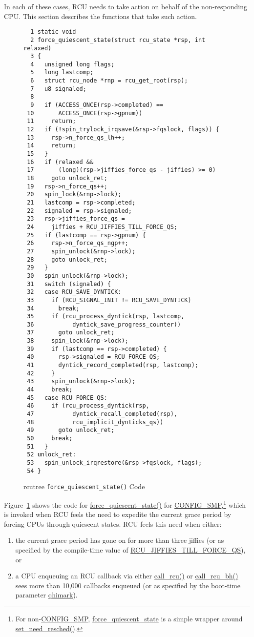 In each of these cases, RCU needs to take action on behalf of the
non-responding CPU.
This section describes the functions that take such action.



\begin{figure}[htbp]
{ \scriptsize
\begin{verbatim}
  1 static void
  2 force_quiescent_state(struct rcu_state *rsp, int relaxed)
  3 {
  4   unsigned long flags;
  5   long lastcomp;
  6   struct rcu_node *rnp = rcu_get_root(rsp);
  7   u8 signaled;
  8 
  9   if (ACCESS_ONCE(rsp->completed) ==
 10       ACCESS_ONCE(rsp->gpnum))
 11     return;
 12   if (!spin_trylock_irqsave(&rsp->fqslock, flags)) {
 13     rsp->n_force_qs_lh++;
 14     return;
 15   }
 16   if (relaxed &&
 17       (long)(rsp->jiffies_force_qs - jiffies) >= 0)
 18     goto unlock_ret;
 19   rsp->n_force_qs++;
 20   spin_lock(&rnp->lock);
 21   lastcomp = rsp->completed;
 22   signaled = rsp->signaled;
 23   rsp->jiffies_force_qs =
 24     jiffies + RCU_JIFFIES_TILL_FORCE_QS;
 25   if (lastcomp == rsp->gpnum) {
 26     rsp->n_force_qs_ngp++;
 27     spin_unlock(&rnp->lock);
 28     goto unlock_ret;
 29   }
 30   spin_unlock(&rnp->lock);
 31   switch (signaled) {
 32   case RCU_SAVE_DYNTICK:
 33     if (RCU_SIGNAL_INIT != RCU_SAVE_DYNTICK)
 34       break;
 35     if (rcu_process_dyntick(rsp, lastcomp,
 36           dyntick_save_progress_counter))
 37       goto unlock_ret;
 38     spin_lock(&rnp->lock);
 39     if (lastcomp == rsp->completed) {
 40       rsp->signaled = RCU_FORCE_QS;
 41       dyntick_record_completed(rsp, lastcomp);
 42     }
 43     spin_unlock(&rnp->lock);
 44     break;
 45   case RCU_FORCE_QS:
 46     if (rcu_process_dyntick(rsp,
 47           dyntick_recall_completed(rsp),
 48           rcu_implicit_dynticks_qs))
 49       goto unlock_ret;
 50     break;
 51   }
 52 unlock_ret:
 53   spin_unlock_irqrestore(&rsp->fqslock, flags);
 54 }
\end{verbatim}
}
\caption{rcutree {\tt force\_quiescent\_state()} Code}
\label{fig:app:rcuimpl:rcutreewt:Code for rcutree force-quiescent-state}
\end{figure}

Figure~\ref{fig:app:rcuimpl:rcutreewt:Code for rcutree force-quiescent-state}
shows the code for \url{force_quiescent_state()} for
\url{CONFIG_SMP},\footnote{
	For non-\url{CONFIG_SMP}, \url{force_quiescent_state} is a
	simple wrapper around \url{set_need_resched()}.}
which is invoked when RCU feels the need to expedite the current
grace period by forcing CPUs through quiescent states.
RCU feels this need when either:
\begin{enumerate}
\item	the current grace period has gone on for more than three jiffies
	(or as specified by the compile-time value of
	\url{RCU_JIFFIES_TILL_FORCE_QS}), or
\item	a CPU enqueuing an RCU callback via either \url{call_rcu()}
	or \url{call_rcu_bh()} sees more than 10,000 callbacks enqueued
	(or as specified by the boot-time parameter \url{qhimark}).
\end{enumerate}

